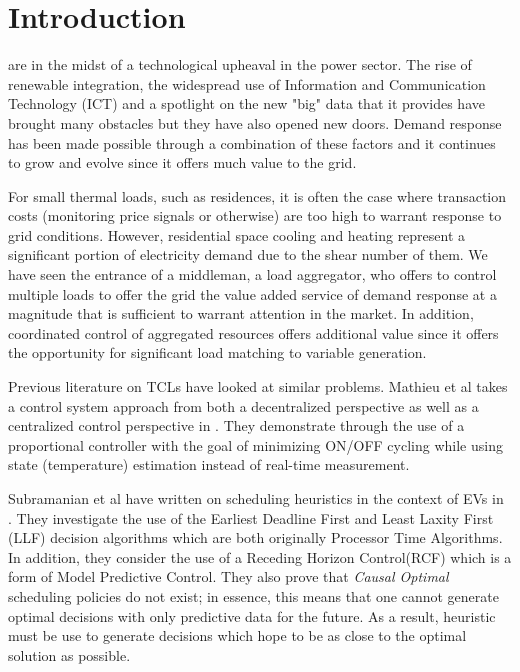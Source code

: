 \documentclass[journal]{IEEEtran}
\begin{document}
\section{Introduction}
% 
% 
% 
% 
 are in the midst of a technological upheaval in the power sector. The rise of renewable integration, the widespread use of Information and Communication Technology (ICT) and a spotlight on the new "big" data that it provides have brought many obstacles but they have also opened new doors. Demand response has been made possible through a combination of these factors and it continues to grow and evolve since it offers much value to the grid. 

For small thermal loads, such as residences, it is often the case where transaction costs (monitoring price signals or otherwise) are too high to warrant response to grid conditions. However, residential space cooling and heating represent a significant portion of electricity demand due to the shear number of them. We have seen the entrance of a middleman, a load aggregator, who offers to control multiple loads to offer the grid the value added service of demand response at a magnitude that is sufficient to warrant attention in the market. In addition, coordinated control of aggregated resources offers additional value since it offers the opportunity for significant load matching to variable generation.

Previous literature on TCLs have looked at similar problems. Mathieu et al takes a control system approach from both a decentralized perspective as well as a centralized control perspective in \cite{mat}. They demonstrate through the use of a proportional controller with the goal of minimizing ON/OFF cycling while using state (temperature) estimation instead of real-time measurement. 

Subramanian et al have written on scheduling heuristics in the context of EVs in \cite{sub}. They investigate the use of the Earliest Deadline First and Least Laxity First (LLF) decision algorithms which are both originally Processor Time Algorithms. In addition, they consider the use of a Receding Horizon Control(RCF) which is a form of Model Predictive Control. They also prove that \textit{Causal Optimal} scheduling policies do not exist; in essence, this means that one cannot generate optimal decisions with only predictive data for the future. As a result, heuristic must be use to generate decisions which hope to be as close to the optimal solution as possible.
\end{document}
